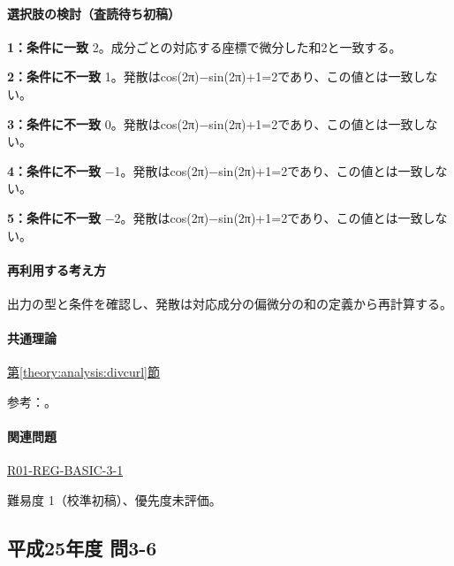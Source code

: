 \paragraph{選択肢の検討（査読待ち初稿）}\mbox{}\par

\noindent\textbf{1：条件に一致} 2。成分ごとの対応する座標で微分した和2と一致する。\par

\noindent\textbf{2：条件に不一致} 1。発散はcos(2π)−sin(2π)+1=\allowbreak{}2であり、この値とは一致しない。\par

\noindent\textbf{3：条件に不一致} 0。発散はcos(2π)−sin(2π)+1=\allowbreak{}2であり、この値とは一致しない。\par

\noindent\textbf{4：条件に不一致} −1。発散はcos(2π)−sin(2π)+1=\allowbreak{}2であり、この値とは一致しない。\par

\noindent\textbf{5：条件に不一致} −2。発散はcos(2π)−sin(2π)+1=\allowbreak{}2であり、この値とは一致しない。\par

\paragraph{再利用する考え方} 出力の型と条件を確認し、発散は対応成分の偏微分の和の定義から再計算する。

\paragraph{共通理論} \hyperref[theory:analysis:divcurl]{第\ref*{theory:analysis:divcurl}節}

\par 参考：\cite{mit_vectorcalc2005}。

\paragraph{関連問題} \hyperref[q:r01-reg-basic-3-1]{R01-REG-BASIC-3-1}

\par 難易度 1（校準初稿）、優先度未評価。

\subsection{平成25年度 問3-6}
\label{q:h25-reg-basic-3-6}

